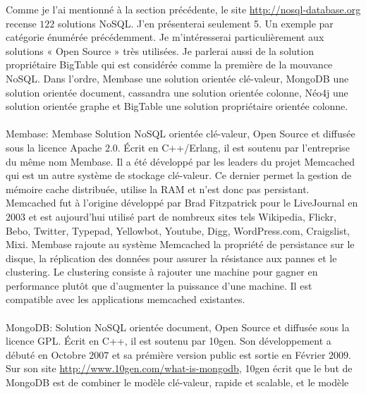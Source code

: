 Comme je l'ai mentionné à la section précédente, le
site \url{http://nosql-database.org} recense $122$
solutions \textsf{NoSQL}.  J'en présenterai seulement 5. Un exemple
par catégorie énumérée précédemment. Je m'intéresserai
particulièrement aux solutions « \textsf{Open Source} » très
utilisées. Je parlerai aussi de la solution propriétaire \textsf{BigTable}
qui est considérée comme la première de la
mouvance \textsf{NoSQL}. Dans l'ordre, \textsf{Membase} une solution
orientée \textsf{clé-valeur}, \textsf{MongoDB} une solution
orientée \textsf{document}, \textsf{cassandra} une solution
orientée \textsf{colonne}, \textsf{Néo4j} une solution
orientée \textsf{graphe} et \textsf{BigTable} une solution
propriétaire orientée \textsf{colonne}.
\\
\\
\textsf{Membase}: \textsf{Membase} Solution \textsf{NoSQL} orientée \textsf{clé-valeur}, Open Source et diffusée sous la licence Apache 2.0. Écrit en \textsf{C++/Erlang}, il est soutenu par l'entreprise du même nom \textsf{Membase}\cite{RickCattell}. Il a été développé par les leaders du projet \textsf{Memcached} qui est un
autre système de stockage \textsf{clé-valeur}. Ce dernier permet la
gestion de mémoire cache distribuée, utilise la \textsf{RAM} et n'est
donc pas persistant. \textsf{Memcached} fut à l'origine développé
par \textsf{Brad Fitzpatrick} pour le \textsf{LiveJournal} en $2003$
et est aujourd'hui utilisé part de nombreux sites
tels \textsf{Wikipedia, Flickr, Bebo, Twitter, Typepad, Yellowbot,
Youtube, Digg, WordPress.com, Craigslist,
Mixi}\cite{memcached}. \textsf{Membase}
rajoute au système \textsf{Memcached} la propriété de persistance sur
le disque, la réplication des données pour assurer la résistance aux
pannes et le clustering. Le clustering consiste à rajouter une machine
pour gagner en performance plutôt que d'augmenter la puissance d'une
machine. Il est compatible avec les applications memcached existantes.
\\
\\ 
{\sf MongoDB}:  Solution \textsf{NoSQL} orientée \textsf{document},
Open Source et diffusée sous la licence \textsf{GPL}. Écrit
en \textsf{C++}, il est soutenu
par \textsf{10gen}\cite{RickCattell}. Son développement a débuté en Octobre $2007$ et sa prémière version public est sortie en Février $2009$\cite{blogmongodb}. Sur son
site \url{http://www.10gen.com/what-is-mongodb}, \textsf{10gen} écrit
que le but de \textsf{MongoDB} est de combiner le
modèle \textsf{clé-valeur}, rapide et scalable, et le modèle
